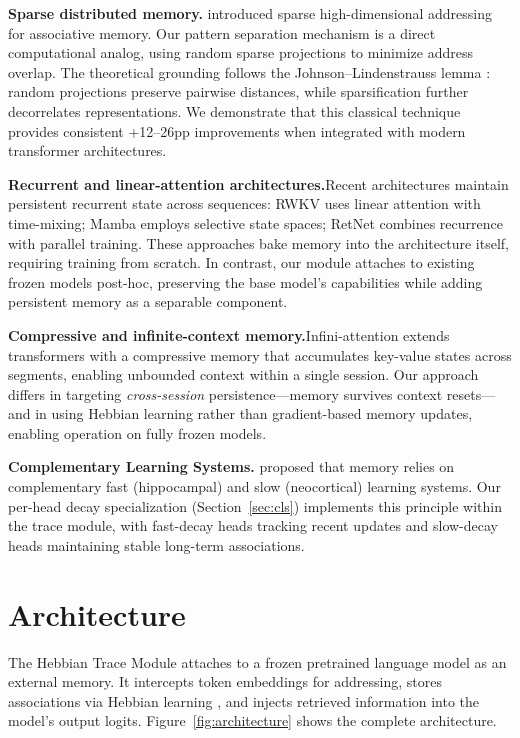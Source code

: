 \documentclass[11pt,a4paper]{article}
\begin{document}
\textbf{Sparse distributed memory.}\quad \citet{kanerva1988sparse} introduced sparse high-dimensional addressing for associative memory. Our pattern separation mechanism is a direct computational analog, using random sparse projections to minimize address overlap. The theoretical grounding follows the Johnson--Lindenstrauss lemma \citep{johnson1984extensions}: random projections preserve pairwise distances, while sparsification further decorrelates representations. We demonstrate that this classical technique provides consistent +12--26pp improvements when integrated with modern transformer architectures.

\textbf{Recurrent and linear-attention architectures.}\quad Recent architectures maintain persistent recurrent state across sequences: RWKV \citep{peng2023rwkv} uses linear attention with time-mixing; Mamba \citep{gu2023mamba} employs selective state spaces; RetNet \citep{sun2023retentive} combines recurrence with parallel training. These approaches bake memory into the architecture itself, requiring training from scratch. In contrast, our module attaches to existing frozen models post-hoc, preserving the base model's capabilities while adding persistent memory as a separable component.

\textbf{Compressive and infinite-context memory.}\quad Infini-attention \citep{munkhdalai2024leave} extends transformers with a compressive memory that accumulates key-value states across segments, enabling unbounded context within a single session. Our approach differs in targeting \emph{cross-session} persistence---memory survives context resets---and in using Hebbian learning rather than gradient-based memory updates, enabling operation on fully frozen models.

\textbf{Complementary Learning Systems.}\quad \citet{mcclelland1995complementary} proposed that memory relies on complementary fast (hippocampal) and slow (neocortical) learning systems. Our per-head decay specialization (Section~\ref{sec:cls}) implements this principle within the trace module, with fast-decay heads tracking recent updates and slow-decay heads maintaining stable long-term associations.

\section{Architecture}

The Hebbian Trace Module attaches to a frozen pretrained language model as an external memory. It intercepts token embeddings for addressing, stores associations via Hebbian learning \citep{hebb1949organization}, and injects retrieved information into the model's output logits. Figure~\ref{fig:architecture} shows the complete architecture.
\end{document}
